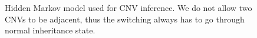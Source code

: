 \begin{figure}[h]
\caption{Hidden Markov model used for CNV inference. We do not allow two CNVs to be adjacent, thus the switching always has to go through normal inheritance state.}\label{fig:hmm_main}
\end{figure}


